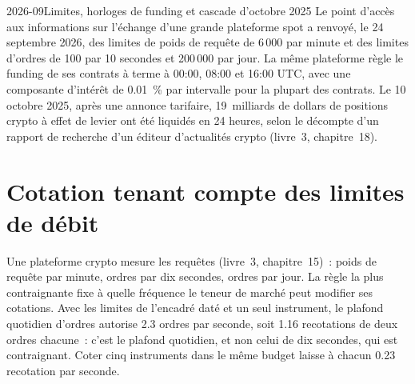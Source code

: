 \begin{dated}{2026-09}{Limites, horloges de funding et cascade d'octobre 2025}\label{dat:hf:crypto-high-frequency-trading-on-centralised-venues:limits}
Le point d'accès aux informations sur l'échange d'une grande plateforme spot a renvoyé, le 24 septembre 2026, des limites de poids de requête de 6\,000 par minute et des limites d'ordres de 100 par
10 secondes et 200\,000 par jour. La même plateforme règle le funding de ses contrats à terme à 00:00, 08:00 et 16:00 UTC, avec une composante d'intérêt de 0.01~\% par
intervalle pour la plupart des contrats. Le 10 octobre 2025, après une annonce tarifaire, 19~milliards de dollars de positions crypto à effet de levier ont été liquidés en 24
heures, selon le décompte d'un rapport de recherche d'un éditeur d'actualités crypto (livre~3, chapitre~18).
\end{dated}

\section{Cotation tenant compte des limites de débit}

Une plateforme crypto mesure les requêtes (livre~3, chapitre~15)~: poids de requête par minute, ordres par dix secondes, ordres par jour. La règle la plus contraignante fixe
à quelle fréquence le teneur de marché peut modifier ses cotations. Avec les limites de l'encadré daté et un seul instrument, le plafond quotidien d'ordres autorise 2.3 ordres par seconde, soit 1.16
recotations de deux ordres chacune~: c'est le plafond quotidien, et non celui de dix secondes, qui est contraignant. Coter cinq instruments dans le même budget laisse à chacun 0.23 recotation par
seconde.

